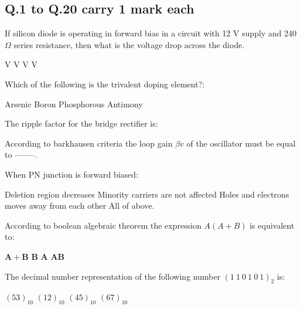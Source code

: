 \documentclass[a4, 12pt, addpoints]{exam}
\begin{document}
\begin{questions}
\section*{\normalsize Q.1 to Q.20 carry 1 mark each}
\question If silicon diode is operating in forward bias in a circuit with 12 V supply and 240 $\Omega$ series resistance, then what is the voltage drop across the diode. \\[0.3cm]
\begin{oneparchoices}
 V
 V
 V
 V
\end{oneparchoices}  
\question Which of the following is the trivalent doping element?:\\[0.3cm]
\begin{oneparchoices}
\choice Arsenic
\choice Boron
\choice Phosphorous
\choice Antimony
\end{oneparchoices}  
\question The ripple factor for the bridge rectifier is:\\[0.3cm]
\begin{oneparchoices}
\end{oneparchoices}  
\question According to barkhausen criteria the loop gain $\beta v$ of the oscillator must be equal to --------.\\[0.3cm]
\begin{oneparchoices}
\end{oneparchoices}
\question When PN junction is forward biased:\\[0.3cm]
 \begin{oneparchoices}
\choice Deletion region decreases
\choice Minority carriers are not affected
\choice Holes and electrons moves away from each other
\choice All of above.
\end{oneparchoices} 
\question According to boolean algebraic theorem  the expression $A (A + B)$ is equivalent to: \\[0.3cm]
 \begin{oneparchoices}
\choice $\pmb{A + B} $ 
\choice $\pmb{B}$
\choice $\pmb{A}$
\choice $\pmb{AB}$
\end{oneparchoices} 
\question The decimal number representation of the following number $ (1~1~0~1~0~1)_2 $ is: \\[0.3cm]
\begin{oneparchoices}
\choice $ (53)_{10} $ 
\choice $ (12)_{10} $
\choice $ (45)_{10}$
\choice $ (67)_{10} $

\end{oneparchoices}
\end{questions}
\end{document}
